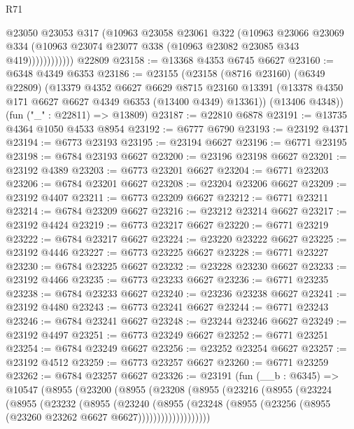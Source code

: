 \begin{lexlean}{R71}
\begin{coremodule}
                    @23050
                    @23053
                    @317
                    (@10963
                      @23058
                      @23061
                      @322
                      (@10963
                        @23066
                        @23069
                        @334
                        (@10963 @23074 @23077 @338 (@10963 @23082 @23085 @343 @419))))))))))))
    @22809
@23158 := @13368 @4353 @6745 @6627
@23160 := @6348 @4349 @6353
@23186 := @23155
    (@23158
      (@8716 @23160)
      (@6349 @22809)
      (@13379
        @4352
        @6627
        @6629
        @8715
        @23160
        @13391
        (@13378 @4350 @171 @6627 @6627 @4349 @6353 (@13400 @4349) @13361))
      (@13406 @4348))
    (fun ("_" : @22811) => @13809)
@23187 := @22810 @6878
@23191 := @13735 @4364 @1050 @4533 @8954
@23192 := @6777 @6790
@23193 := @23192 @4371
@23194 := @6773 @23193
@23195 := @23194 @6627
@23196 := @6771 @23195
@23198 := @6784 @23193 @6627
@23200 := @23196 @23198 @6627
@23201 := @23192 @4389
@23203 := @6773 @23201 @6627
@23204 := @6771 @23203
@23206 := @6784 @23201 @6627
@23208 := @23204 @23206 @6627
@23209 := @23192 @4407
@23211 := @6773 @23209 @6627
@23212 := @6771 @23211
@23214 := @6784 @23209 @6627
@23216 := @23212 @23214 @6627
@23217 := @23192 @4424
@23219 := @6773 @23217 @6627
@23220 := @6771 @23219
@23222 := @6784 @23217 @6627
@23224 := @23220 @23222 @6627
@23225 := @23192 @4446
@23227 := @6773 @23225 @6627
@23228 := @6771 @23227
@23230 := @6784 @23225 @6627
@23232 := @23228 @23230 @6627
@23233 := @23192 @4466
@23235 := @6773 @23233 @6627
@23236 := @6771 @23235
@23238 := @6784 @23233 @6627
@23240 := @23236 @23238 @6627
@23241 := @23192 @4480
@23243 := @6773 @23241 @6627
@23244 := @6771 @23243
@23246 := @6784 @23241 @6627
@23248 := @23244 @23246 @6627
@23249 := @23192 @4497
@23251 := @6773 @23249 @6627
@23252 := @6771 @23251
@23254 := @6784 @23249 @6627
@23256 := @23252 @23254 @6627
@23257 := @23192 @4512
@23259 := @6773 @23257 @6627
@23260 := @6771 @23259
@23262 := @6784 @23257 @6627
@23326 := @23191
    (fun (__b : @6345) =>
    @10547
      (@8955
        (@23200
          (@8955
            (@23208
              (@8955
                (@23216
                  (@8955
                    (@23224
                      (@8955
                        (@23232
                          (@8955
                            (@23240
                              (@8955
                                (@23248
                                  (@8955
                                    (@23256 (@8955 (@23260 @23262 @6627 @6627)))))))))))))))))))

\end{coremodule}
\end{lexlean}
